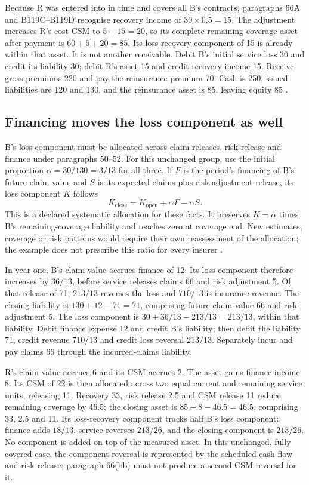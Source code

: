 Because R was entered into in time and covers all B's contracts, paragraphs
66A and B119C--B119D recognise recovery income of \(30\times0.5=15\).
The adjustment increases R's cost CSM to \(5+15=20\), so its complete
remaining-coverage asset after payment is \(60+5+20=85\). Its loss-recovery
component of 15 is already within that asset. It is not another receivable.
Debit B's initial service loss 30 and credit its liability 30; debit R's
asset 15 and credit recovery income 15. Receive gross premiums 220 and pay
the reinsurance premium 70. Cash is 250, issued liabilities are 120 and 130,
and the reinsurance asset is 85, leaving equity 85
\citep[paragraphs 60--68, 78 and B119C--B119F]{aasb17}.

\subsection*{Financing moves the loss component as well}

B's loss component must be allocated across claim releases, risk release
and finance under paragraphs 50--52. For this unchanged group, use the
initial proportion \(\alpha=30/130=3/13\) for all three. If \(F\) is
the period's financing of B's future claim value and \(S\) is its expected
claims plus risk-adjustment release, its loss component \(K\) follows
\[
 K_{\mathrm{close}}=K_{\mathrm{open}}+\alpha F-\alpha S.
\]
This is a declared systematic allocation for these facts. It preserves
\(K=\alpha\) times B's remaining-coverage liability and reaches zero at
coverage end. New estimates, coverage or risk patterns would require their
own reassessment of the allocation; the example does not prescribe this
ratio for every insurer \citep[paragraphs 49--52 and B124]{aasb17}.

In year one, B's claim value accrues finance of 12. Its loss component
therefore increases by \(36/13\), before service releases claims 66 and
risk adjustment 5. Of that release of 71, \(213/13\) reverses the loss
and \(710/13\) is insurance revenue. The closing liability is
\(130+12-71=71\), comprising future claim value 66 and risk adjustment 5.
The loss component is \(30+36/13-213/13=213/13\), within that liability.
Debit finance expense 12 and credit B's liability; then debit the liability
71, credit revenue \(710/13\) and credit loss reversal \(213/13\).
Separately incur and pay claims 66 through the incurred-claims liability.

R's claim value accrues 6 and its CSM accrues 2. The asset gains finance
income 8. Its CSM of 22 is then allocated across two equal current and
remaining service units, releasing 11. Recovery 33, risk release 2.5 and
CSM release 11 reduce remaining coverage by 46.5; the closing asset is
\(85+8-46.5=46.5\), comprising 33, 2.5 and 11. Its loss-recovery component
tracks half B's loss component: finance adds \(18/13\), service reverses
\(213/26\), and the closing component is \(213/26\). No component is
added on top of the measured asset. In this unchanged, fully covered case,
the component reversal is represented by the scheduled cash-flow and risk
release; paragraph 66(bb) must not produce a second CSM reversal for it.

